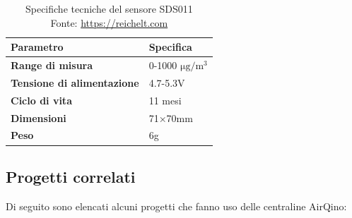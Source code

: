 \begin{table}[H]
    \footnotesize
    \centering
    \begin{tabular}{|l|l|}
    \hline
        \textbf{Parametro} & \textbf{Specifica} \\ \hline
        \textbf{Range di misura} & 0-1000 $\mathrm{\si{\micro}g/m^3}$ \\ \hline
        \textbf{Tensione di alimentazione} & 4.7-5.3V \\ \hline
        \textbf{Ciclo di vita} & 11 mesi \\ \hline
        \textbf{Dimensioni} & 71×70mm \\ \hline
        \textbf{Peso} & 6g \\ \hline
    \end{tabular}
    \captionsetup{justification=centering}
    \caption{Specifiche tecniche del sensore SDS011\\Fonte: \url{https://reichelt.com}}
    \label{fig:sds-specifiche}
\end{table}

\subsection{Progetti correlati}\label{ssec:correlati}
Di seguito sono elencati alcuni progetti che fanno uso delle centraline AirQino:


